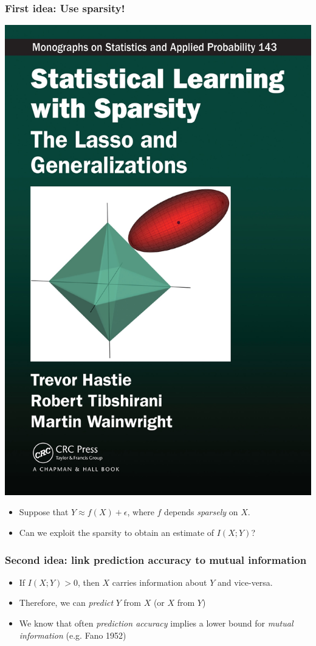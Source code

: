 \documentclass{beamer}
\begin{document}
\begin{frame}
\frametitle{First idea: Use sparsity!}
\begin{center}
\includegraphics[scale = 0.05]{sls.jpg}
\end{center}
\begin{itemize}
\item Suppose that $Y \approx f(X) + \epsilon$, where $f$ depends \emph{sparsely} on $X$.
\item Can we exploit the sparsity to obtain an estimate of $I(X; Y)$?
\end{itemize}
\end{frame}

\begin{frame}
\frametitle{Second idea: link prediction accuracy to mutual information}
\begin{itemize}
\item If $I(X; Y) > 0$, then $X$ carries information about $Y$ and vice-versa. \pause
\item Therefore, we can \emph{predict} $Y$ from $X$ (or $X$ from $Y$) \pause
\item We know that often \emph{prediction accuracy} implies a lower bound for \emph{mutual information} (e.g. Fano 1952)
\end{itemize}
\end{frame}
\end{document}
